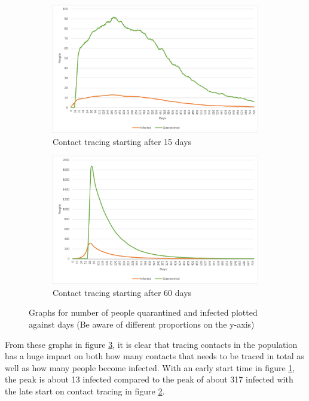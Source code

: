 \begin{figure}[H]
\centering
\begin{subfigure}{.5\textwidth}
  \centering
  \includegraphics[width=.95\linewidth]{0_billeder/CT15Days.png}
  \caption{Contact tracing starting after 15 days}
  \label{Subfig:CT15}
\end{subfigure}%
\begin{subfigure}{.5\textwidth}
  \centering
  \includegraphics[width=.95\linewidth]{0_billeder/CT60Days.png}
  \caption{Contact tracing starting after 60 days}
  \label{Subfig:CT60}
\end{subfigure}
\caption{Graphs for number of people quarantined and infected plotted against days (Be aware of different proportions on the y-axis)}
\label{fig:CTstart1}
\end{figure}

From these graphs in figure \ref{fig:CTstart1}, it is clear that tracing contacts in the population has a huge impact on both how many contacts that needs to be traced in total as well as how many people become infected. With an early start time in figure \ref{Subfig:CT15}, the peak is about 13 infected compared to the peak of about 317 infected with the late start on contact tracing in figure \ref{Subfig:CT60}. 

